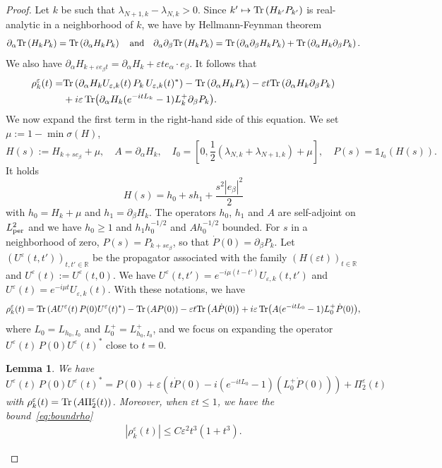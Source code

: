 \documentclass[a4paper,11pt]{article}
\theoremstyle{plain}
\newtheorem{lemma}[theorem]{Lemma}
\theoremstyle{remark}
\def\R{{\mathbb R}}
\def\eps{{\varepsilon}}
\def\1{{\mathds 1}}
\begin{document}
\begin{proof}[Proof]  Let $k$ be such that $\lambda_{N+1,k}-\lambda_{N,k} > 0$. Since $k' \mapsto {\rm Tr} \left(H_{k'} P_{k'}\right)$ is real-analytic in a neighborhood of $k$, we have by Hellmann-Feynman theorem
\begin{align*}
 \partial_\alpha {\rm Tr} \left(H_k P_k\right) =  {\rm Tr} \left(\partial_\alpha H_k P_k\right) \quad \mbox{and} \quad
  {\partial_\alpha\partial_\beta} {\rm Tr} \left(H_k P_k\right) =  {\rm Tr}
\left(  {\partial_\alpha\partial_\beta}
 H_k P_k\right) +  {\rm Tr} \left(\partial_\alpha H_k \partial_\beta P_k\right).
\end{align*}
We also have $\partial_\alpha H_{k+\eps e_\beta t} =
\partial_\alpha H_k + \eps t e_\alpha \cdot e_\beta$. It follows that
\begin{align*}
\rho^\eps_k(t)=&{\rm Tr} \left(\partial_\alpha H_kU_{\eps,k}(t)\, P_k\, U_{\eps,k}(t)^*\right) - {\rm Tr} \left(\partial_\alpha H_k P_k\right) - \eps t  {\rm Tr} \left(\partial_\alpha H_k \partial_\beta P_k\right) \\ & + i \eps \Tr(\partial_\alpha H_k (e^{-i t L_k} - 1) L_{k}^{+}  \partial_\beta P_k).
\end{align*}
We now expand the first term in the right-hand side of this equation. We set $\mu := 1 - \min \sigma(H)$,
$$H(s):=H_{k+se_\beta}+\mu,\quad A=\partial_\alpha H_k, \quad
I_{0}=[0,\frac 12(\lambda_{N,k}+\lambda_{N+1,k})+\mu],\quad P(s)=\1_{I_{0}}(H(s)).$$
It holds
$$H(s)=h_0+sh_1+\frac{s^2 |e_\beta|^{2}}2$$
 with $h_0=H_k+\mu$ and $h_1=\partial_\beta H_k$. The operators $h_0$, $h_1$ and $A$ are self-adjoint on $L^2_{\rm per}$ and we have $h_0 \ge 1$ and $h_1h_0^{-1/2}$ and $Ah_0^{-1/2}$ bounded.
  For $s$ in a neighborhood of zero, $P(s)= P_{k+se_\beta}$, so that $\dot{P}(0)=\partial_\beta P_k$.  Let $(U^\eps(t,t'))_{t,t' \in \R}$ be the propagator associated with the family $(H(\eps t))_{t \in \R}$ and $U^\eps(t):=U^\eps(t,0)$.
We have $U^\eps(t,t')=e^{-i\mu(t-t')} U_{\eps,k}(t,t')$ and $U^\eps(t)=e^{-i\mu t} U_{\eps,k}(t)$.
With these notations, we have
$$
\rho^\eps_k(t)={\rm Tr} \left(A U^\eps(t)\, P(0) U^\eps(t)^*\right) - {\rm Tr} \left(AP(0) \right) - \eps t  {\rm Tr} \left(A  \dot{P}(0) \right) + i \eps \Tr(A (e^{-i t L_0} - 1) L_0^{+}  \dot{P}(0)),
$$
where $L_0=L_{h_0,I_{0}}$ and $L_0^+=L_{h_0,I_{0}}^+$, and we focus on expanding the operator $U^\eps(t)\, P(0) U^\eps(t)^*$ close to $t=0$.

\begin{lemma}\label{lem:Dyson+}
We have
\begin{equation}\label{eq:Dyson+}
U^\eps(t)\, P(0) U^\eps(t)^* = P(0) +  \eps \left(t \dot{P}(0) - i \left( e^{-itL_0}-1 \right) (L_0^+\dot{P}(0))\right) + \Pi^\eps_2(t)
\end{equation}
with $\rho^\eps_k(t) = {\rm Tr} \left(A \Pi_2^\eps(t) \right)$.
Moreover, when $\eps t\le1$, we have the bound~\eqref{eq:boundrho}
\begin{align*}
  |\rho^\eps_k(t)| \le C \eps^2 t^3 (1+ t^3 ).
\end{align*}


\end{lemma}
\end{proof}
\end{document}
